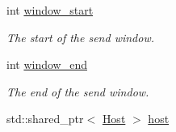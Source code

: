 \begin{DoxyCompactItemize}
\item 
int \hyperlink{classFlow_a0ef05b40ea27e2fecabb44d20219a40a}{window\-\_\-start}
\begin{DoxyCompactList}\small\item\em \-The start of the send window. \end{DoxyCompactList}\item 
int \hyperlink{classFlow_afdc42d6ad08298dd64a8b85e933dbac6}{window\-\_\-end}
\begin{DoxyCompactList}\small\item\em \-The end of the send window. \end{DoxyCompactList}\item 
\hypertarget{classFlow_af45cdc7b3609577eb08cb072e9631809}{std\-::shared\-\_\-ptr$<$ \hyperlink{classHost}{\-Host} $>$ \hyperlink{classFlow_af45cdc7b3609577eb08cb072e9631809}{host}}\label{classFlow_af45cdc7b3609577eb08cb072e9631809}


\end{DoxyCompactItemize}
